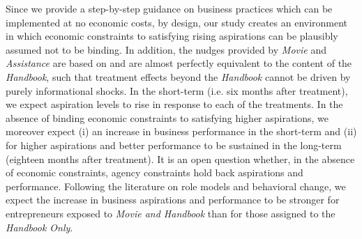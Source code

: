 \documentclass[11.5pt]{article}
\begin{document}
Since we provide a step-by-step guidance on business practices which can be implemented at no economic costs, by design, our study creates an environment in which economic constraints to satisfying rising aspirations can be plausibly assumed not to be binding. In addition, %
the nudges provided by \emph{Movie} and \emph{Assistance} are based on and are almost perfectly equivalent to the content of the \emph{Handbook}, such that treatment effects beyond the \emph{Handbook} cannot be driven by purely informational shocks. In the short-term (i.e. six months after treatment), we expect aspiration levels to rise in response to each of the treatments. In the absence of binding economic constraints to satisfying higher aspirations, we moreover expect (i) an increase in business performance in the short-term and (ii) for higher aspirations and better performance to be sustained in the long-term (eighteen months after treatment). It is an open question whether, in the absence of economic constraints, agency constraints hold back aspirations and performance. Following the literature on role models and behavioral change, we expect the increase in business aspirations and performance to be stronger for entrepreneurs exposed to \emph{Movie and Handbook} than for those assigned to the \emph{Handbook Only}. %

\end{document}
